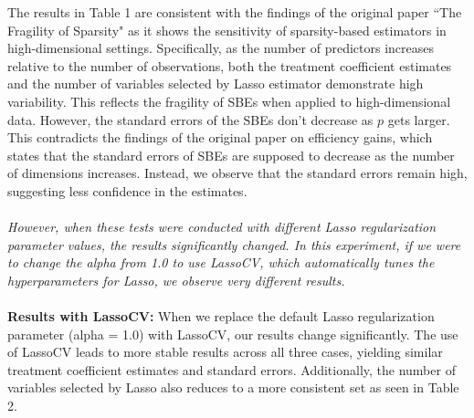 The results in Table 1 are consistent with the findings of the original paper ``The Fragility of Sparsity" as it shows the sensitivity of sparsity-based estimators in high-dimensional settings. Specifically, as the number of predictors increases relative to the number of observations, both the treatment coefficient estimates and the number of variables selected by Lasso estimator demonstrate high variability. This reflects the fragility of SBEs when applied to high-dimensional data. However, the standard errors of the SBEs don't decrease as $p$ gets larger. This contradicts the findings of the original paper on efficiency gains, which states that the standard errors of SBEs are supposed to decrease as the number of dimensions increases. Instead, we observe that the standard errors remain high, suggesting less confidence in the estimates. \\
\\
\textit{However, when these tests were conducted with different Lasso regularization parameter values, the results significantly changed. In this experiment, if we were to change the alpha from 1.0 to use LassoCV, which automatically tunes the hyperparameters for Lasso, we observe very different results.} \\
\\
\textbf{Results with LassoCV: }
When we replace the default Lasso regularization parameter (alpha = 1.0) with LassoCV, our results change significantly. The use of LassoCV leads to more stable results across all three cases, yielding similar treatment coefficient estimates and standard errors. Additionally, the number of variables selected by Lasso also reduces to a more consistent set as seen in Table 2. \\
